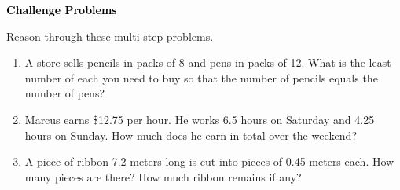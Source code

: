 \documentclass[12pt, letterpaper, fleqn]{article}
\begin{document}
\newpage

\begin{tcolorbox}[colback=black!10]
\large\textcolor{black}{\textbf{Challenge Problems}}
\end{tcolorbox}

\noindent
Reason through these multi-step problems.

\vspace{3mm}
\begin{enumerate}[itemsep=2.4cm, leftmargin=0.6cm]
\item A store sells pencils in packs of 8 and pens in packs of 12. What is the least number of each you need to buy so that the number of pencils equals the number of pens?

\vspace{2.3cm}

\item Marcus earns \$12.75 per hour. He works 6.5 hours on Saturday and 4.25 hours on Sunday. How much does he earn in total over the weekend?

\vspace{2.3cm}

\item A piece of ribbon 7.2 meters long is cut into pieces of 0.45 meters each. How many pieces are there? How much ribbon remains if any?

\vspace{2.5cm}

\end{enumerate}
\end{document}
